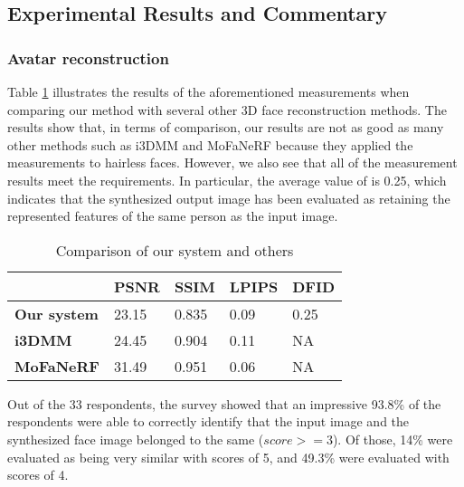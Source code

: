 \subsection{Experimental Results and Commentary}
\subsubsection{Avatar reconstruction}

Table \ref{loss_stats} illustrates the results of the aforementioned measurements when comparing our method with several other 3D face reconstruction methods. The results show that, in terms of comparison, our results are not as good as many other methods such as i3DMM and MoFaNeRF because they applied the measurements to hairless faces. However, we also see that all of the measurement results meet the requirements. In particular, the average value of  is 0.25, which indicates that the synthesized output image has been evaluated as retaining the represented features of the same person as the input image.

\begin{table}[H]
    \centering
    \captionsetup{font=bf}
    \caption{Comparison of our system and others}
    \begin{tabularx}{\linewidth}{| X | X | X | X | X |}
        \hline
                            & \textbf{PSNR} & \textbf{SSIM} & \textbf{LPIPS} & \textbf{DFID} \\ \hline\hline
        \textbf{Our system} & 23.15         & 0.835         & 0.09           & 0.25          \\ \hline %
        \textbf{i3DMM}      & 24.45         & 0.904         & 0.11           & NA            \\ \hline
        \textbf{MoFaNeRF}   & 31.49         & 0.951         & 0.06           & NA            \\ \hline
    \end{tabularx}
    \label{loss_stats}
\end{table}

Out of the 33 respondents, the survey showed that an impressive 93.8\% of the respondents were able to correctly identify that the input image and the synthesized face image belonged to the same  ($score >= 3$). Of those, 14\% were evaluated as being very similar with scores of 5, and 49.3\% were evaluated with scores of 4. %

